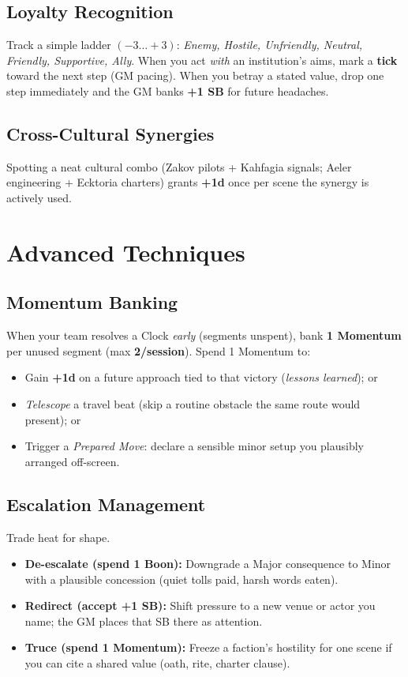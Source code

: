 \subsection{Loyalty Recognition}
Track a simple ladder \((-3\ldots+3)\): \emph{Enemy, Hostile, Unfriendly, Neutral, Friendly, Supportive, Ally}. When you act \emph{with} an institution's aims, mark a \textbf{tick} toward the next step (GM pacing). When you betray a stated value, drop one step immediately and the GM banks \textbf{+1 SB} for future headaches.

\subsection{Cross-Cultural Synergies}
Spotting a neat cultural combo (Zakov pilots + Kahfagia signals; Aeler engineering + Ecktoria charters) grants \textbf{+1d} once per scene the synergy is actively used.

\section{Advanced Techniques}

\subsection{Momentum Banking}\label{sec:momentum-banking}
When your team resolves a Clock \emph{early} (segments unspent), bank \textbf{1 Momentum} per unused segment (max \textbf{2/session}). Spend 1 Momentum to:
\begin{itemize}
  \item Gain \textbf{+1d} on a future approach tied to that victory (\emph{lessons learned}); or
  \item \emph{Telescope} a travel beat (skip a routine obstacle the same route would present); or
  \item Trigger a \emph{Prepared Move}: declare a sensible minor setup you plausibly arranged off-screen.
\end{itemize}

\subsection{Escalation Management}
Trade heat for shape.
\begin{itemize}
  \item \textbf{De-escalate (spend 1 Boon):} Downgrade a Major consequence to Minor with a plausible concession (quiet tolls paid, harsh words eaten).
  \item \textbf{Redirect (accept +1 SB):} Shift pressure to a new venue or actor you name; the GM places that SB there as attention.
  \item \textbf{Truce (spend 1 Momentum):} Freeze a faction's hostility for one scene if you can cite a shared value (oath, rite, charter clause).%
\end{itemize}

